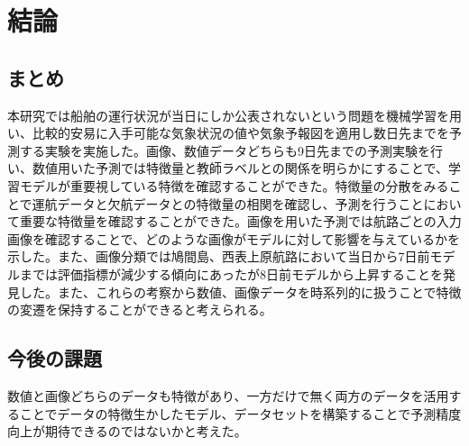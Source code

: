 \chapter{結論}

\section{まとめ}
本研究では船舶の運行状況が当日にしか公表されないという問題を機械学習を用い、比較的安易に入手可能な気象状況の値や気象予報図を適用し数日先までを予測する実験を実施した。画像、数値データどちらも9日先までの予測実験を行い、数値用いた予測では特徴量と教師ラベルとの関係を明らかにすることで、学習モデルが重要視している特徴を確認することができた。特徴量の分散をみることで運航データと欠航データとの特徴量の相関を確認し、予測を行うことにおいて重要な特徴量を確認することができた。画像を用いた予測では航路ごとの入力画像を確認することで、どのような画像がモデルに対して影響を与えているかを示した。また、画像分類では鳩間島、西表上原航路において当日から7日前モデルまでは評価指標が減少する傾向にあったが8日前モデルから上昇することを発見した。また、これらの考察から数値、画像データを時系列的に扱うことで特徴の変遷を保持することができると考えられる。

\section{今後の課題}
数値と画像どちらのデータも特徴があり、一方だけで無く両方のデータを活用することでデータの特徴生かしたモデル、データセットを構築することで予測精度向上が期待できるのではないかと考えた。